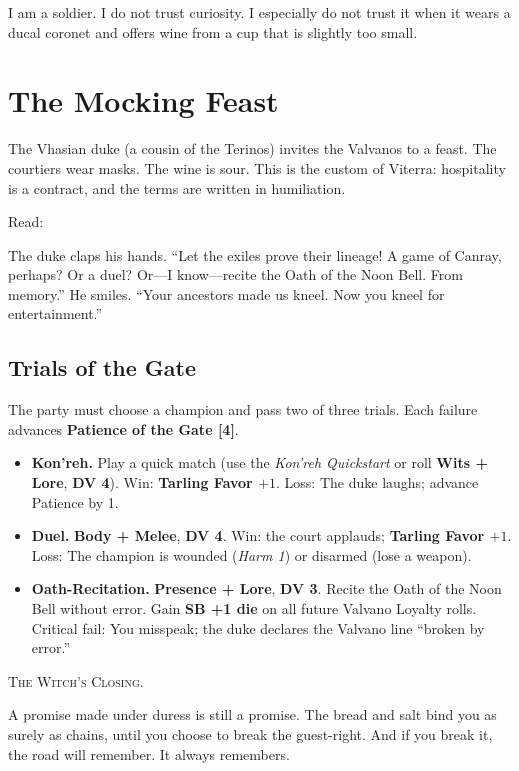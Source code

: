 \documentclass[11pt,a5paper]{book}
\newcommand{\sb}[1]{\textbf{SB #1}}
\newcommand{\dv}[1]{\textbf{DV #1}}
\newcommand{\clock}[1]{\textbf{[#1]}}
\newcommand{\condition}[1]{\textit{#1}}
\newenvironment{witchclosing}
  {\begin{quoting}[font={small\itshape}, leftmargin=2em, rightmargin=2em]\noindent\textsc{The Witch's Closing.}\par}
  {\end{quoting}}
\begin{document}
\lettrine{I}{} am a soldier. I do not trust curiosity. I especially do not trust it when it wears a ducal coronet and offers wine from a cup that is slightly too small.

\section*{The Mocking Feast}

The Vhasian duke (a cousin of the Terinos) invites the Valvanos to a feast. The courtiers wear masks. The wine is sour. This is the custom of Viterra: hospitality is a contract, and the terms are written in humiliation.

Read:
\begin{quoting}
The duke claps his hands. ``Let the exiles prove their lineage! A game of Canray, perhaps? Or a duel? Or---I know---recite the Oath of the Noon Bell. From memory.'' He smiles. ``Your ancestors made us kneel. Now you kneel for entertainment.''
\end{quoting}

\subsection*{Trials of the Gate}

The party must choose a champion and pass two of three trials. Each failure advances \textbf{Patience of the Gate \clock{4}}.

\begin{itemize}[leftmargin=*]
\item \textbf{Kon'reh.} Play a quick match (use the \textit{Kon'reh Quickstart} or roll \textbf{Wits + Lore}, \dv{4}). Win: \textbf{Tarling Favor $+1$}. Loss: The duke laughs; advance Patience by 1.
\item \textbf{Duel.} \textbf{Body + Melee}, \dv{4}. Win: the court applauds; \textbf{Tarling Favor $+1$}. Loss: The champion is wounded (\condition{Harm 1}) or disarmed (lose a weapon).
\item \textbf{Oath-Recitation.} \textbf{Presence + Lore}, \dv{3}. Recite the Oath of the Noon Bell without error. Gain \sb{+1 die} on all future Valvano Loyalty rolls. Critical fail: You misspeak; the duke declares the Valvano line ``broken by error.''
\end{itemize}

\begin{witchclosing}
A promise made under duress is still a promise. The bread and salt bind you as surely as chains, until you choose to break the guest-right. And if you break it, the road will remember. It always remembers.
\end{witchclosing}
\end{document}
